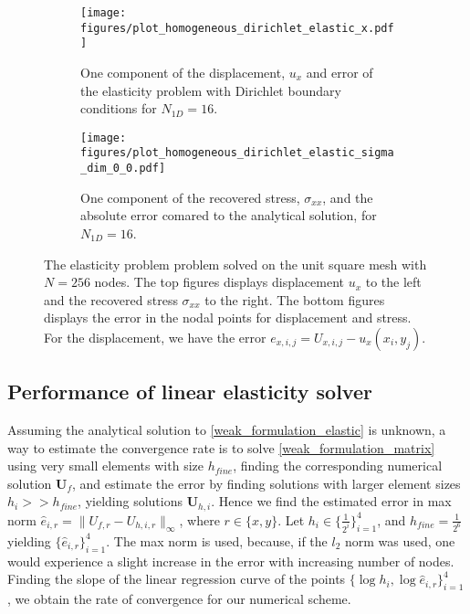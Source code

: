\documentclass[a4paper,english]{elsarticle}%
\begin{document}
\begin{figure}[ht]   
    \begin{subfigure}[b]{0.5\textwidth}
        \centering
            \texttt{[image: figures/plot\_homogeneous\_dirichlet\_elastic\_x.pdf]}
            \caption{One component of the displacement, $u_x$ and error of the elasticity problem with Dirichlet boundary conditions for $N_{1D} = 16$.}
        \label{solution-error-dirichlet-elastic-x}
    \end{subfigure}\qquad
    \begin{subfigure}[b]{0.5\textwidth}
        \centering
            \texttt{[image: figures/plot\_homogeneous\_dirichlet\_elastic\_sigma\_dim\_0\_0.pdf]}
            \caption{One component of the recovered stress, $\sigma_{xx}$, and the absolute error comared to the analytical solution, for $N_{1D} = 16$.}
        \label{solution-error-dirichlet-elastic-sigma-xx}
    \end{subfigure}

    \caption{The elasticity problem problem solved on the unit square mesh with $N = 256$ nodes. The top figures displays displacement $u_x$ to the left and the recovered stress $\sigma_{xx}$ to the right. The bottom figures displays the error in the nodal points for displacement and stress. For the displacement, we have the error $e_{x,i,j} = U_{x,i,j} - u_x(x_i,y_j)$.}
\end{figure}

\subsection{Performance of linear elasticity solver}
Assuming the analytical solution to \eqref{weak_formulation_elastic} is unknown, a way to estimate the convergence rate is to solve \eqref{weak_formulation_matrix} using very small elements with size $h_{fine}$, finding the corresponding numerical solution $\bm U_f$, and estimate the error by finding solutions with larger element sizes $h_i >> h_{fine}$, yielding solutions $\bm U_{h,i}$. Hence we find the estimated error in max norm $\hat e_{i,r} = \|U_{f,r} - U_{h,i,r} \|_{\infty}$, where $r\in \{x,y\}$. Let $h_i \in \{\frac{1}{2^i}\}_{i=1}^4$, and $h_{fine} = \frac{1}{2^6}$ yielding $\{\hat e_{i,r}\}_{i=1}^4$. The max norm is used, because, if the $l_2$ norm was used, one would experience a slight increase in the error with increasing number of nodes. Finding the slope of the linear regression curve of the points $\{\log h_i,\log  \hat e_{i,r}\}_{i=1}^4$, we obtain the rate of convergence for our numerical scheme. 
\end{document}

